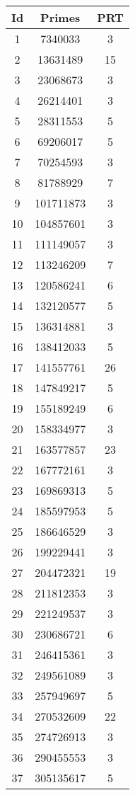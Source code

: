 \begin{spacing}{0.8}
\noindent \begin{tabular}{ccc}
\toprule
       Id & Primes & PRT\\
\midrule 1 & 7340033 & 3\\
 2 & 13631489 & 15\\
 3 & 23068673 & 3\\
 4 & 26214401 & 3\\
 5 & 28311553 & 5\\
 6 & 69206017 & 5\\
 7 & 70254593 & 3\\
 8 & 81788929 & 7\\
 9 & 101711873 & 3\\
 10 & 104857601 & 3\\
 11 & 111149057 & 3\\
 12 & 113246209 & 7\\
 13 & 120586241 & 6\\
 14 & 132120577 & 5\\
 15 & 136314881 & 3\\
 16 & 138412033 & 5\\
 17 & 141557761 & 26\\
 18 & 147849217 & 5\\
 19 & 155189249 & 6\\
 20 & 158334977 & 3\\
 21 & 163577857 & 23\\
 22 & 167772161 & 3\\
 23 & 169869313 & 5\\
 24 & 185597953 & 5\\
 25 & 186646529 & 3\\
 26 & 199229441 & 3\\
 27 & 204472321 & 19\\
 28 & 211812353 & 3\\
 29 & 221249537 & 3\\
 30 & 230686721 & 6\\
 31 & 246415361 & 3\\
 32 & 249561089 & 3\\
 33 & 257949697 & 5\\
 34 & 270532609 & 22\\
 35 & 274726913 & 3\\
 36 & 290455553 & 3\\
 37 & 305135617 & 5\\
\bottomrule
\end{tabular}

\end{spacing}
